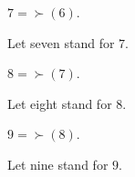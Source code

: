 \documentclass[10pt]{article}
\begin{document}
  \begin{forthel}
    \begin{definition}
      $7 = \succ(6)$.
    \end{definition}

    Let seven stand for $7$.
  \end{forthel}

  \begin{forthel}
    \begin{definition}
      $8 = \succ(7)$.
    \end{definition}

    Let eight stand for $8$.
  \end{forthel}

  \begin{forthel}
    \begin{definition}
      $9 = \succ(8)$.
    \end{definition}

    Let nine stand for $9$.
  \end{forthel}
\end{document}
